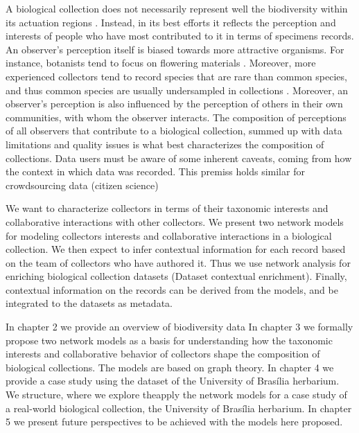 A biological collection does not necessarily represent well the biodiversity within its actuation regions \cite{Funk1999}.
Instead, in its best efforts it reflects the perception and interests of people who have most contributed to it in terms of specimens records.
An observer's perception itself is biased towards more attractive organisms. 
For instance, botanists tend to focus on flowering materials \cite{VanGemerden2005}.
Moreover, more experienced collectors tend to record species that are rare than common species, and thus common species are usually undersampled in collections \cite{Nelson1990}.
Moreover, an observer's perception is also influenced by the perception of others in their own communities, with whom the observer interacts. 
The composition of perceptions of all observers that contribute to a biological collection, summed up with data limitations and quality issues is what best characterizes the composition of collections.
Data users must be aware of some inherent caveats, coming from how the context in which data was recorded. 
This premiss holds similar for crowdsourcing data (citizen science)


We want to characterize collectors in terms of their taxonomic interests and collaborative interactions with other collectors.
We present two network models for modeling collectors interests and collaborative interactions in a biological collection.
We then expect to infer contextual information for each record based on the team of collectors who have authored it.
Thus we use network analysis for enriching biological collection datasets (Dataset contextual enrichment).
Finally, contextual information on the records can be derived from the models, and be integrated to the datasets as metadata. %



In chapter 2 we provide an overview of biodiversity data
%
In chapter 3 we formally propose two network models as a basis for understanding how the taxonomic interests and collaborative behavior of collectors shape the composition of biological collections.
The models are based on graph theory.
%
In chapter 4 we provide a case study using the dataset of the University of Brasília herbarium.
We structure, where we explore theapply the network models for a case study of a real-world biological collection, the University of Brasília herbarium.
%
In chapter 5 we present future perspectives to be achieved with the models here proposed.




